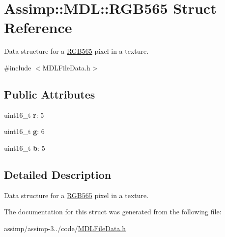 \hypertarget{struct_assimp_1_1_m_d_l_1_1_r_g_b565}{\section{Assimp\+:\+:M\+D\+L\+:\+:R\+G\+B565 Struct Reference}
\label{struct_assimp_1_1_m_d_l_1_1_r_g_b565}
}


Data structure for a \hyperlink{struct_assimp_1_1_m_d_l_1_1_r_g_b565}{R\+G\+B565} pixel in a texture.  




{\ttfamily \#include $<$M\+D\+L\+File\+Data.\+h$>$}

\subsection*{Public Attributes}
\begin{DoxyCompactItemize}
\item 
\hypertarget{struct_assimp_1_1_m_d_l_1_1_r_g_b565_aa1ff0a9e77da22a593cba3c4153a2c74}{uint16\+\_\+t {\bfseries r}\+: 5}\label{struct_assimp_1_1_m_d_l_1_1_r_g_b565_aa1ff0a9e77da22a593cba3c4153a2c74}

\item 
\hypertarget{struct_assimp_1_1_m_d_l_1_1_r_g_b565_aadfab3093f2fbc3dbc7eeaac623c568a}{uint16\+\_\+t {\bfseries g}\+: 6}\label{struct_assimp_1_1_m_d_l_1_1_r_g_b565_aadfab3093f2fbc3dbc7eeaac623c568a}

\item 
\hypertarget{struct_assimp_1_1_m_d_l_1_1_r_g_b565_ae64a1a8351ccd03ecddc8b19d5bee366}{uint16\+\_\+t {\bfseries b}\+: 5}\label{struct_assimp_1_1_m_d_l_1_1_r_g_b565_ae64a1a8351ccd03ecddc8b19d5bee366}

\end{DoxyCompactItemize}


\subsection{Detailed Description}
Data structure for a \hyperlink{struct_assimp_1_1_m_d_l_1_1_r_g_b565}{R\+G\+B565} pixel in a texture. 

The documentation for this struct was generated from the following file\+:\begin{DoxyCompactItemize}
\item 
assimp/assimp-\/3../code/\hyperlink{_m_d_l_file_data_8h}{M\+D\+L\+File\+Data.\+h}\end{DoxyCompactItemize}
